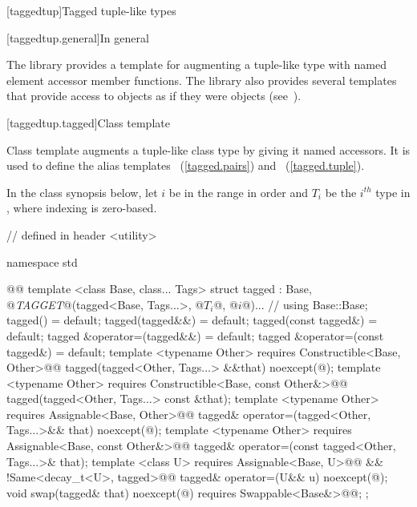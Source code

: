\setcounter{section}{14}

{\color{addclr}
[taggedtup]{Tagged tuple-like types}

[taggedtup.general]{In general}

\pnum The library provides a template for augmenting a tuple-like type with named element accessor
member functions. The library also provides several templates that provide access to 
objects as if they were  objects (see~).


[taggedtup.tagged]{Class template }

Class template  augments a tuple-like class type by giving it named accessors. It is
used to define the alias templates ~(\ref{tagged.pairs}) and
~(\ref{tagged.tuple}).

\pnum In the class synopsis below, let $i$ be in the range
 in order and $T_i$ be the $i^{th}$ type in , where indexing
is zero-based.

%
\begin{codeblock}
// defined in header <utility>

namespace std { @@
  template <class Base, class... Tags>
  struct tagged :
    Base, @\textit{TAGGET}@(tagged<Base, Tags...>, @$T_i$@, @$i$@)... { // \seebelow
    using Base::Base;
    tagged() = default;
    tagged(tagged&&) = default;
    tagged(const tagged&) = default;
    tagged &operator=(tagged&&) = default;
    tagged &operator=(const tagged&) = default;
    template <typename Other>
      requires Constructible<Base, Other>@\newtxt{()}@
    tagged(tagged<Other, Tags...> &&that) noexcept(@\seebelow@);
    template <typename Other>
      requires Constructible<Base, const Other&>@\newtxt{()}@
    tagged(tagged<Other, Tags...> const &that);
    template <typename Other>
      requires Assignable<Base, Other>@\newtxt{()}@
    tagged& operator=(tagged<Other, Tags...>&& that) noexcept(@\seebelow@);
    template <typename Other>
      requires Assignable<Base, const Other&>@\newtxt{()}@
    tagged& operator=(const tagged<Other, Tags...>& that);
    template <class U>
      requires Assignable<Base, U>@\newtxt{()}@ && !Same<decay_t<U>, tagged>@\newtxt{()}@
    tagged& operator=(U&& u) noexcept(@\seebelow@);
    void swap(tagged& that) noexcept(@\seebelow@)
      requires Swappable<Base&>@\newtxt{()}@;
  };

}
\end{codeblock}}
